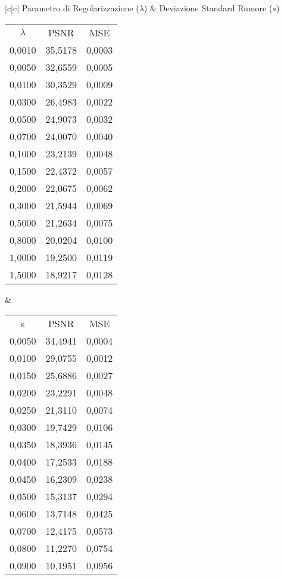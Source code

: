 \documentclass{article}
\begin{document}
\begin{center}
\begin{tabular}{ |c|c|}
\hline
Parametro di Regolarizzazione ($\lambda$) & Deviazione Standard Rumore ($s$) \\
\hline
\begin{tabular}{c|c|c}
$\lambda$ &	PSNR &	MSE \\
0,0010 &	35,5178 &	0,0003 \\
0,0050 &	32,6559 &	0,0005 \\
0,0100 &	30,3529 &	0,0009 \\
0,0300 &	26,4983 &	0,0022 \\
0,0500 &	24,9073 &	0,0032 \\
0,0700 &	24,0070 &	0,0040 \\
0,1000 &	23,2139 &	0,0048 \\
0,1500 &	22,4372 &	0,0057 \\
0,2000 &	22,0675 &	0,0062 \\
0,3000 &	21,5944 &	0,0069 \\
0,5000 &	21,2634 &	0,0075 \\
0,8000 &	20,0204 &	0,0100 \\
1,0000 &	19,2500 &	0,0119 \\
1,5000 &	18,9217 &	0,0128 \\
\hline
\end{tabular} & 
\begin{tabular}{c|c|c}
s &	PSNR &	MSE \\
0,0050 &	34,4941 &	0,0004 \\
0,0100 &	29,0755 &	0,0012 \\
0,0150 &	25,6886 &	0,0027 \\
0,0200 &	23,2291 &	0,0048 \\
0,0250 &	21,3110 &	0,0074 \\
0,0300 &	19,7429 &	0,0106 \\
0,0350 &	18,3936 &	0,0145 \\
0,0400 &	17,2533 &	0,0188 \\
0,0450 &	16,2309 &	0,0238 \\
0,0500 &	15,3137 &	0,0294 \\
0,0600 &	13,7148 &	0,0425 \\
0,0700 &	12,4175 &	0,0573 \\
0,0800 &	11,2270 &	0,0754 \\
0,0900 &	10,1951 &	0,0956 \\
\hline
\end{tabular}
\end{tabular}
\end{center}
\end{document}
